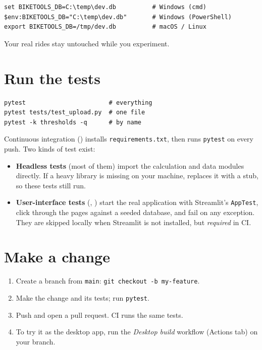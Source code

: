 \begin{tip}
\begin{lstlisting}[style=plain]
set BIKETOOLS_DB=C:\temp\dev.db          # Windows (cmd)
$env:BIKETOOLS_DB="C:\temp\dev.db"       # Windows (PowerShell)
export BIKETOOLS_DB=/tmp/dev.db          # macOS / Linux
\end{lstlisting}
Your real rides stay untouched while you experiment.
\end{tip}

\section{Run the tests}

\begin{lstlisting}[style=plain]
pytest                       # everything
pytest tests/test_upload.py  # one file
pytest -k thresholds -q      # by name
\end{lstlisting}

Continuous integration () installs \texttt{requirements.txt}, then runs
\texttt{pytest} on every push. Two kinds of test exist:

\begin{itemize}
\item \textbf{Headless tests} (most of them) import the calculation and data modules directly. If a heavy library is
  missing on your machine,  replaces it with a stub, so these tests still run.
\item \textbf{User-interface tests} (, ) start the real
  application with Streamlit's \texttt{AppTest}, click through the pages against a seeded database, and fail on any
  exception. They are skipped locally when Streamlit is not installed, but \emph{required} in CI.
\end{itemize}

\section{Make a change}

\begin{enumerate}
\item Create a branch from \texttt{main}: \texttt{git checkout -b my-feature}.
\item Make the change and its tests; run \texttt{pytest}.
\item Push and open a pull request. CI runs the same tests.
\item To try it as the desktop app, run the \emph{Desktop build} workflow (Actions tab) on your branch.
\end{enumerate}

